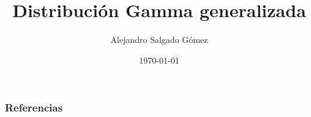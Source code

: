 \documentclass[t]{beamer}
\begin{document}
\title{Distribución Gamma generalizada}
\author{Alejandro Salgado Gómez}
\date{\today}

\begin{frame}
\titlepage
\end{frame}









\begin{frame}[allowframebreaks]
    \frametitle{Referencias}
    
    
\end{frame}
\end{document}
